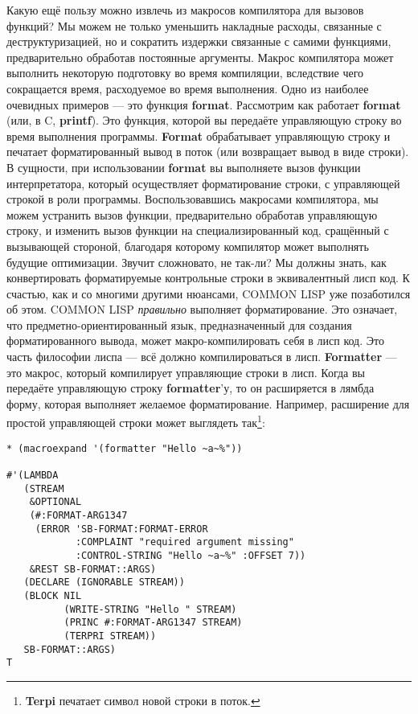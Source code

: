 Какую ещё пользу можно извлечь из макросов компилятора для вызовов функций? Мы можем не только уменьшить накладные расходы, связанные с деструктуризацией, но и сократить издержки связанные с самими функциями, предварительно обработав постоянные аргументы. Макрос компилятора может выполнить некоторую подготовку во время компиляции, вследствие чего сокращается время, расходуемое во время выполнения. Одно из наиболее очевидных примеров --- это функция \textbf{format}. Рассмотрим как работает \textbf{format} (или, в C, \textbf{printf}). Это функция, которой вы передаёте управляющую строку во время выполнения программы. \textbf{Format} обрабатывает управляющую строку и печатает форматированный вывод в поток (или возвращает вывод в виде строки). В сущности, при использовании \textbf{format} вы выполняете вызов функции интерпретатора, который осуществляет форматирование строки, с управляющей строкой в роли программы. Воспользовавшись макросами компилятора, мы можем устранить вызов функции, предварительно обработав управляющую строку, и изменить вызов функции на специализированный код, сращённый с вызывающей стороной, благодаря которому компилятор может выполнять будущие оптимизации. Звучит сложновато, не так-ли? Мы должны знать, как конвертировать форматируемые контрольные строки в эквивалентный лисп код. К счастью, как и со многими другими нюансами, COMMON LISP уже позаботился об этом. COMMON LISP \emph{правильно} выполняет форматирование. Это означает, что предметно-ориентированный язык, предназначенный для создания форматированного вывода, может макро-компилировать себя в лисп код. Это часть философии лиспа --- всё должно компилироваться в лисп. \textbf{Formatter} --- это макрос, который компилирует управляющие строки в лисп. Когда вы передаёте управляющую строку \textbf{formatter}'у, то он расширяется в лямбда форму, которая выполняет желаемое форматирование. Например, расширение для простой управляющей строки может выглядеть так\footnote{\textbf{Terpi} печатает символ новой строки в поток.}:

\begin{verbatim}
* (macroexpand '(formatter "Hello ~a~%"))

#'(LAMBDA
   (STREAM
    &OPTIONAL
    (#:FORMAT-ARG1347
     (ERROR 'SB-FORMAT:FORMAT-ERROR
            :COMPLAINT "required argument missing"
            :CONTROL-STRING "Hello ~a~%" :OFFSET 7))
    &REST SB-FORMAT::ARGS)
   (DECLARE (IGNORABLE STREAM))
   (BLOCK NIL
          (WRITE-STRING "Hello " STREAM)
          (PRINC #:FORMAT-ARG1347 STREAM)
          (TERPRI STREAM))
   SB-FORMAT::ARGS)
T
\end{verbatim}

